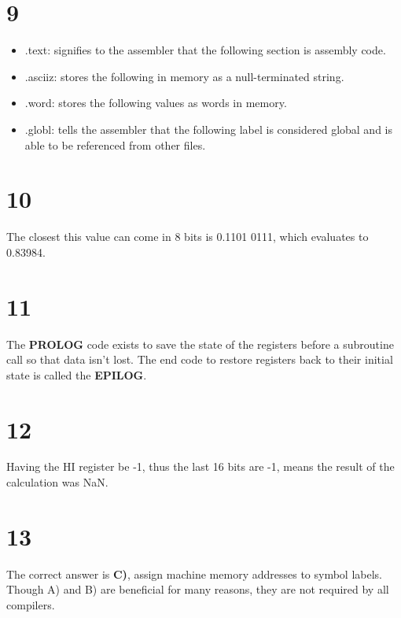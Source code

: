 \documentclass[a4paper,11pt]{article}
\begin{document}

\section*{9}
\begin{itemize}
    \item .text: signifies to the assembler that the following section is assembly code.
    \item .asciiz: stores the following in memory as a null-terminated string.
    \item .word: stores the following values as words in memory.
    \item .globl: tells the assembler that the following label is considered global and is able to be referenced from other files.
\end{itemize}



\section*{10}
The closest this value can come in 8 bits is 0.1101 0111, which evaluates to 0.83984.


\section*{11}
The {\bf PROLOG} code exists to save the state of the registers before a subroutine call so that data isn't lost.  The end code to restore registers back to their initial state is called the {\bf EPILOG}.


\section*{12}
Having the HI register be -1, thus the last 16 bits are -1, means the result of the calculation was NaN.


\section*{13}
The correct answer is {\bf C)}, assign machine memory addresses to symbol labels.  Though A) and B) are beneficial for many reasons, they are not required by all compilers.  
\end{document}
